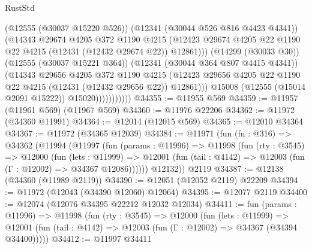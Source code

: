 \begin{lexlean}{RustStd}
\begin{coremodule}
                              (@12555 (@30037 @15220 @526))
                              (@12341 (@30044 @526 @816 @4423 @4341))
                              (@14343
                                @29674
                                @4205
                                @372
                                @1190
                                @4215
                                (@12423
                                  @29674
                                  @4205
                                  @22
                                  @1190
                                  @22
                                  @4215
                                  (@12431 (@12432 @29674 @22))
                                  @12861)))
                            (@14299 (@30033 @30))
                            (@12555 (@30037 @15221 @364))
                            (@12341 (@30044 @364 @807 @4415 @4341))
                            (@14343
                              @29656
                              @4205
                              @372
                              @1190
                              @4215
                              (@12423
                                @29656
                                @4205
                                @22
                                @1190
                                @22
                                @4215
                                (@12431 (@12432 @29656 @22))
                                @12861)))
                          @15008
                          (@12555 (@15014 @2091 @15222))
                          @15020)))))))))))
@34355 := @11955 @569
@34359 := @11957 (@11961 @569) (@11967 @569)
@34360 := @11976 @22206
@34362 := @11972 (@34360 @11991)
@34364 := @12014 (@12015 @569)
@34365 := @12010 @34364
@34367 := @11972 (@34365 @12039)
@34384 := @11971
    (fun (fn : @316) =>
    @34362
      (@11994
        (@11997
          (fun (params : @11996) =>
          @11998
            (fun (rty : @3545) =>
            @12000
              (fun (lets : @11999) =>
              @12001 (fun (tail : @4142) => @12003 (fun (Γ : @12002) => @34367 @12086))))))
        @12132))
    @2119
@34387 := @12138 (@34360 (@11989 @2119))
@34390 := @12051 (@12052 @2119) @22209
@34394 := @11972 (@12043 (@34390 @12060) @12064)
@34395 := @12077 @2119
@34400 := @12074 (@12076 @34395 @22212 @12032 @12034)
@34411 := fun (params : @11996) =>
  @11998
    (fun (rty : @3545) =>
    @12000
      (fun (lets : @11999) =>
      @12001 (fun (tail : @4142) => @12003 (fun (Γ : @12002) => @34367 (@34394 @34400)))))
@34412 := @11997 @34411

\end{coremodule}
\end{lexlean}
